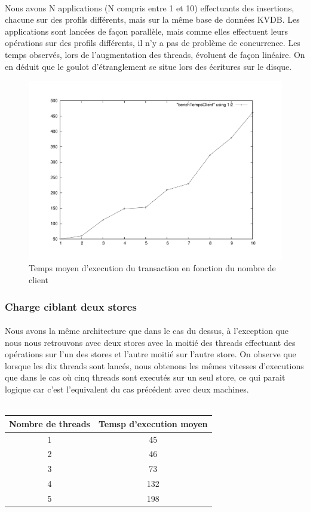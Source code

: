 \paragraph{}
Nous avons N applications (N compris entre 1 et 10) effectuants des insertions, chacune sur des profils différents, mais sur la même base de données KVDB. Les applications sont lancées de façon parallèle, mais comme elles effectuent leurs opérations sur des profils différents, il n'y a pas de problème de concurrence.
Les temps observés, lors de l'augmentation des threads, évoluent de façon linéaire. On en déduit que le goulot d'étranglement se situe lors des écritures sur le disque.
\\
\newpage
\begin{figure}
  \centering
  \includegraphics[scale=0.5]{src/benchTempsClient}
  \caption{Temps moyen d'execution du transaction en fonction du nombre de client}
\end{figure}

\subsubsection{Charge ciblant deux stores}
\paragraph{}
Nous avons la même architecture que dans le cas du dessus, à l'exception que nous nous retrouvons avec deux stores avec la moitié des threads effectuant des opérations sur l'un des stores et l'autre moitié sur l'autre store.
On observe que lorsque les dix threads sont lancés, nous obtenons les mêmes vitesses d'executions que dans le cas où cinq threads sont executés sur un seul store, ce qui parait logique car c'est l'equivalent du cas précédent avec deux machines.
\\
\\
\begin{tabular}{|c|c|}
    \hline
    Nombre de threads & Temsp d'execution moyen \tabularnewline
    \hline
    1 & 45 \tabularnewline
    2 & 46 \tabularnewline
    3 & 73 \tabularnewline
    4 & 132 \tabularnewline
    5 & 198 \tabularnewline
    \hline
 \end{tabular}


